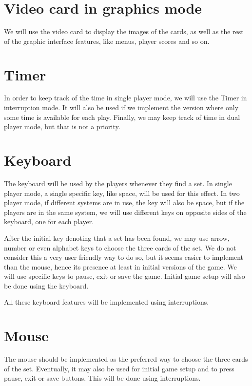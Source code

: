 \documentclass[11pt,a4paper,reqno]{report}
\numberwithin{equation}{section}
\begin{document}
\section{Video card in graphics mode}

We will use the video card to display the images of the cards, as well as the rest of the graphic interface features, like menus, player scores and so on.

\section{Timer}

In order to keep track of the time in single player mode, we will use the Timer in interruption mode. It will also be used if we implement the version where only some time is available for each play. Finally, we may keep track of time in dual player mode, but that is not a priority.

\section{Keyboard}

The keyboard will be used by the players whenever they find a set. In single player mode, a single specific key, like space, will be used for this effect. In two player mode, if different systems are in use, the key will also be space, but if the players are in the same system, we will use different keys on opposite sides of the keyboard, one for each player. 

After the initial key denoting that a set has been found, we may use arrow, number or even alphabet keys to choose the three cards of the set. We do not consider this a very user friendly way to do so, but it seems easier to implement than the mouse, hence its presence at least in initial versions of the game. We will use specific keys to pause, exit or save the game. Initial game setup will also be done using the keyboard. 

All these keyboard features will be implemented using interruptions.

\section{Mouse}

The mouse should be implemented as the preferred way to choose the three cards of the set. Eventually, it may also be used for initial game setup and to press pause, exit or save buttons. This will be done using interruptions.
\end{document}
